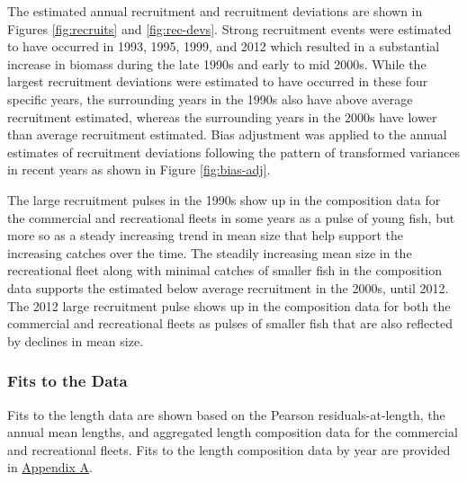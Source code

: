 \documentclass[11pt,
  english,
  a4paper,
]{article}
\begin{document}
\leavevmode\tagmcend\tagstructend\par


The estimated annual recruitment and recruitment deviations are shown in Figures \ref{fig:recruits} and \ref{fig:rec-devs}. Strong recruitment events were estimated to have occurred in 1993, 1995, 1999, and 2012 which resulted in a substantial increase in biomass during the late 1990s and early to mid 2000s. While the largest recruitment deviations were estimated to have occurred in these four specific years, the surrounding years in the 1990s also have above average recruitment estimated, whereas the surrounding years in the 2000s have lower than average recruitment estimated. Bias adjustment was applied to the annual estimates of recruitment deviations following the pattern of transformed variances in recent years as shown in Figure \ref{fig:bias-adj}.

\leavevmode\tagmcend\tagstructend\par


The large recruitment pulses in the 1990s show up in the composition data for the commercial and recreational fleets in some years as a pulse of young fish, but more so as a steady increasing trend in mean size that help support the increasing catches over the time. The steadily increasing mean size in the recreational fleet along with minimal catches of smaller fish in the composition data supports the estimated below average recruitment in the 2000s, until 2012. The 2012 large recruitment pulse shows up in the composition data for both the commercial and recreational fleets as pulses of smaller fish that are also reflected by declines in mean size.

\leavevmode\tagmcend\tagstructend\par


\hypertarget{fits-to-the-data}{%
\subsubsection{Fits to the Data}\label{fits-to-the-data}}

\leavevmode\tagmcend\tagstructend


Fits to the length data are shown based on the Pearson residuals-at-length, the annual mean lengths, and aggregated length composition data for the commercial and recreational fleets. Fits to the length composition data by year are provided in {\protect\hyperlink{append_a}{Appendix A}\leavevmode\tagmcend\tagstructend}.
\end{document}
